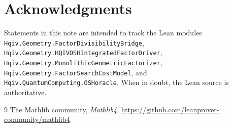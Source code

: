 \documentclass[11pt,a4paper]{article}
\theoremstyle{plain}
\theoremstyle{definition}
\theoremstyle{remark}
\begin{document}
\section*{Acknowledgments}

Statements in this note are intended to track the Lean modules
\texttt{Hqiv.Geometry.FactorDivisibilityBridge},
\texttt{Hqiv.Geometry.HQIVOSHIntegratedFactorDriver},
\texttt{Hqiv.Geometry.MonolithicGeometricFactorizer},
\texttt{Hqiv.Geometry.FactorSearchCostModel}, and
\texttt{Hqiv.QuantumComputing.OSHoracle}. When in doubt, the Lean source is authoritative.

\begin{thebibliography}{9}
The Mathlib community, \emph{Mathlib4}, \url{https://github.com/leanprover-community/mathlib4}.
\end{thebibliography}
\end{document}
